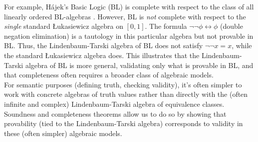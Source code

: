 For example, Hájek's Basic Logic (BL) \cite[Ch.~2]{Hajek1998} is complete with respect to the class of all linearly ordered BL-algebras \cite[Thm.~2.3.15]{Hajek1998}. However, BL is \textit{not} complete with respect to the \textit{single} standard Łukasiewicz algebra on $[0,1]$. The formula $\neg \neg \phi \leftrightarrow \phi$ (double negation elimination) is a tautology in this particular algebra but not provable in BL. Thus, the Lindenbaum-Tarski algebra of BL does not satisfy $\neg \neg x = x$, while the standard Łukasiewicz algebra does. This illustrates that the Lindenbaum-Tarski algebra of BL is more general, validating only what is provable in BL, and that completeness often requires a broader class of algebraic models.\\

For semantic purposes (defining truth, checking validity), it's often simpler to work with concrete algebras of truth values rather than directly with the (often infinite and complex) Lindenbaum-Tarski algebra of equivalence classes. Soundness and completeness theorems allow us to do so by showing that provability (tied to the Lindenbaum-Tarski algebra) corresponds to validity in these (often simpler) algebraic models.\\

\\



